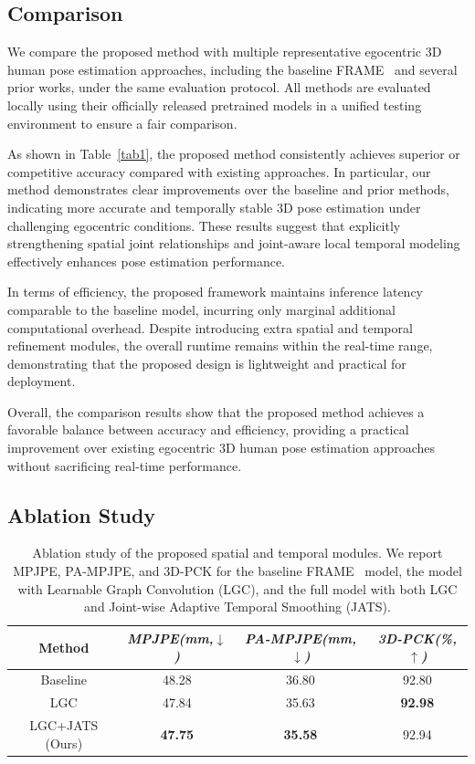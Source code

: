 \documentclass[conference]{IEEEtran}
\begin{document}
\subsection{Comparison}
We compare the proposed method with multiple representative egocentric 3D human pose estimation approaches, including the baseline FRAME~\cite{b1} and several prior works, under the same evaluation protocol. All methods are evaluated locally using their officially released pretrained models in a unified testing environment to ensure a fair comparison.

As shown in Table~\ref{tab1}, the proposed method consistently achieves superior or competitive accuracy compared with existing approaches. In particular, our method demonstrates clear improvements over the baseline and prior methods, indicating more accurate and temporally stable 3D pose estimation under challenging egocentric conditions. These results suggest that explicitly strengthening spatial joint relationships and joint-aware local temporal modeling effectively enhances pose estimation performance.

In terms of efficiency, the proposed framework maintains inference latency comparable to the baseline model, incurring only marginal additional computational overhead. Despite introducing extra spatial and temporal refinement modules, the overall runtime remains within the real-time range, demonstrating that the proposed design is lightweight and practical for deployment.

Overall, the comparison results show that the proposed method achieves a favorable balance between accuracy and efficiency, providing a practical improvement over existing egocentric 3D human pose estimation approaches without sacrificing real-time performance.



\subsection{Ablation Study}
\begin{table}[htbp]
\caption{Ablation study of the proposed spatial and temporal modules. We report MPJPE, PA-MPJPE, and 3D-PCK for the baseline FRAME~\cite{b1} model, the model with Learnable Graph Convolution (LGC), and the full model with both LGC and Joint-wise Adaptive Temporal Smoothing (JATS).}
\begin{center}
\begin{tabular}{c c c c}
\hline
{Method}& {\textit{MPJPE(mm,$\downarrow$)}}& {\textit{PA-MPJPE(mm,$\downarrow$)}}& {\textit{3D-PCK(\%,$\uparrow$)}}\\
\hline 
{Baseline} & {48.28} & {36.80} & {92.80} \\
{LGC} & {47.84} & {35.63} & \textbf{92.98} \\
{LGC+JATS (Ours)} & \textbf{47.75} & \textbf{35.58} & {92.94} \\
\hline
\end{tabular}
\label{tab2}
\end{center}
\end{table}
\end{document}
